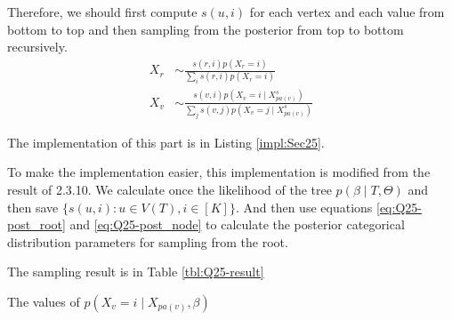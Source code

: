 \documentclass[12pt]{article}
\newenvironment{problem}[2][Problem]{\begin{trivlist}
\item[\hskip \labelsep {\bfseries #1}\hskip \labelsep {\bfseries #2.}]}{\end{trivlist}}
\begin{document}
\begin{problem}{2.5.15}
Therefore, we should first compute $s(u, i)$ for each vertex and each value 
from bottom to top and then sampling from the posterior from top to bottom
recursively.
\begin{align}
    X_r &\sim \frac{s(r,i)p(X_r =i)}{\sum_{i}s(r,i)p(X_r =i)} \label{eq:Q25-post_root} \\ 
    X_v &\sim \frac{s(v,i)p(X_v = i\mid X_{pa(v)}^{s})}
                {\sum_{j}s(v,j)p(X_v = j\mid X_{pa(v)}^{s})} \label{eq:Q25-post_node}
\end{align}
\end{problem}

\begin{problem}{2.5.16}
The implementation of this part is in Listing \ref{impl:Sec25}.

To make the implementation easier, this implementation is modified from the result
of 2.3.10. We calculate once the likelihood of the tree $p(\beta \mid T, \Theta)$ and
then save $\{s(u, i) : u \in V(T), i \in [K]\}$. And then use equations 
\eqref{eq:Q25-post_root} and \eqref{eq:Q25-post_node} to calculate the posterior
categorical distribution parameters for sampling from the root.
\end{problem}

\begin{problem}{2.5.17}
The sampling result is in Table \ref{tbl:Q25-result}

\begin{table}
    \centering
    \caption{The values of $p(X_v = i\mid X_{pa(v)}, \beta)$}\label{tbl:Q25-result}
\end{table} 
\end{problem}
\end{document}
